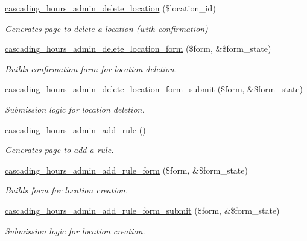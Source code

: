\begin{DoxyCompactItemize}
\hyperlink{cascading__hours_8admin_8php_a72c673dcf8d8e34684eb8540b3a0332e_a72c673dcf8d8e34684eb8540b3a0332e}{cascading\+\_\+hours\+\_\+admin\+\_\+delete\+\_\+location} (\$location\+\_\+id)
\begin{DoxyCompactList}\small\item\em Generates page to delete a location (with confirmation) \end{DoxyCompactList}\item 
\hyperlink{cascading__hours_8admin_8php_a0c55391c2ef3dedd13b15f979d3340ad_a0c55391c2ef3dedd13b15f979d3340ad}{cascading\+\_\+hours\+\_\+admin\+\_\+delete\+\_\+location\+\_\+form} (\$form, \&\$form\+\_\+state)
\begin{DoxyCompactList}\small\item\em Builds confirmation form for location deletion. \end{DoxyCompactList}\item 
\hyperlink{cascading__hours_8admin_8php_a1a327a3b36e6b6338ea9407a7f14a5f9_a1a327a3b36e6b6338ea9407a7f14a5f9}{cascading\+\_\+hours\+\_\+admin\+\_\+delete\+\_\+location\+\_\+form\+\_\+submit} (\$form, \&\$form\+\_\+state)
\begin{DoxyCompactList}\small\item\em Submission logic for location deletion. \end{DoxyCompactList}\item 
\hyperlink{cascading__hours_8admin_8php_a3fe993a03c9e877a31e4842059e7e22a_a3fe993a03c9e877a31e4842059e7e22a}{cascading\+\_\+hours\+\_\+admin\+\_\+add\+\_\+rule} ()
\begin{DoxyCompactList}\small\item\em Generates page to add a rule. \end{DoxyCompactList}\item 
\hyperlink{cascading__hours_8admin_8php_adffbec174f6459c8e137c503546d85aa_adffbec174f6459c8e137c503546d85aa}{cascading\+\_\+hours\+\_\+admin\+\_\+add\+\_\+rule\+\_\+form} (\$form, \&\$form\+\_\+state)
\begin{DoxyCompactList}\small\item\em Builds form for location creation. \end{DoxyCompactList}\item 
\hyperlink{cascading__hours_8admin_8php_a3a9f1797a1338cb2e90712966361c4f3_a3a9f1797a1338cb2e90712966361c4f3}{cascading\+\_\+hours\+\_\+admin\+\_\+add\+\_\+rule\+\_\+form\+\_\+submit} (\$form, \&\$form\+\_\+state)
\begin{DoxyCompactList}\small\item\em Submission logic for location creation. \end{DoxyCompactList}\item 

\end{DoxyCompactItemize}
